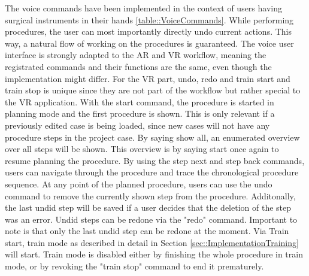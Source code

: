 The voice commands have been implemented in the context of users having surgical instruments in their hands \ref{table::VoiceCommands}.
While performing procedures, the user can most importantly directly undo current actions.
This way, a natural flow of working on the procedures is guaranteed.
The voice user interface is strongly adapted to the AR and VR workflow, meaning the registrated commands and their functions are the same, even though the implementation might differ.
For the VR part, undo, redo and train start and train stop is unique since they are not part of the workflow but rather special to the VR application.
With the start command, the procedure is started in planning mode and the first procedure is shown.
This is only relevant if a previously edited case is being loaded, since new cases will not have any procedure steps in the project case.
By saying show all, an enumerated overview over all steps will be shown. This overview is by saying start once again to resume planning the procedure.
By using the step next and step back commands, users can navigate through the procedure and trace the chronological procedure sequence.
At any point of the planned procedure, users can use the undo command to remove the currently shown step from the procedure.
Additonally, the last undid step will be saved if a user decides that the deletion of the step was an error.
Undid steps can be redone via the "redo" command.
Important to note is that only the last undid step can be redone at the moment.
Via Train start, train mode as described in detail in Section \ref{sec::ImplementationTraining} will start.
Train mode is disabled either by finishing the whole procedure in train mode, or by revoking the "train stop" command to end it prematurely.